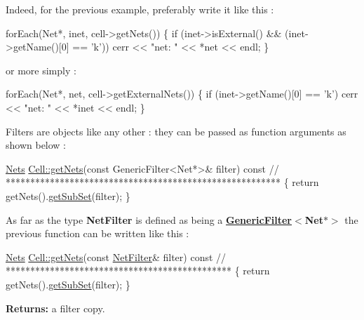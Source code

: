 Indeed, for the previous example, preferably write it like this \+: 
\begin{DoxyCode}
forEach(Net*, inet, cell->getNets()) \{
   \textcolor{keywordflow}{if} (inet->isExternal() && (inet->getName()[0] == \textcolor{charliteral}{'k'}))
      cerr << \textcolor{stringliteral}{"net: "} << *net << endl;
\}
\end{DoxyCode}
 or more simply \+: 
\begin{DoxyCode}
forEach(Net*, net, cell->getExternalNets()) \{
   \textcolor{keywordflow}{if} (inet->getName()[0] == \textcolor{charliteral}{'k'})
      cerr << \textcolor{stringliteral}{"net: "} << *inet << endl;
\}
\end{DoxyCode}
 Filters are objects like any other \+: they can be passed as function arguments as shown below \+: 
\begin{DoxyCode}
\mbox{\hyperlink{namespaceHurricane_a3404a8b17130a1824f4a281704b04df7}{Nets}} \mbox{\hyperlink{classHurricane_1_1Cell_a8b4728abe83e9ec21d7bee1154218279}{Cell::getNets}}(\textcolor{keyword}{const} GenericFilter<Net*>& filter) \textcolor{keyword}{const}
\textcolor{comment}{// ********************************************************}
\{
   \textcolor{keywordflow}{return} getNets().\mbox{\hyperlink{classHurricane_1_1Collection_aa32ea7249d57ee05e3c71dcde8106832}{getSubSet}}(filter);
\}
\end{DoxyCode}
 As far as the type {\bfseries Net\+Filter} is defined as being a {\bfseries \mbox{\hyperlink{classHurricane_1_1GenericFilter}{Generic\+Filter}}$<$Net$\ast$$>$} the previous function can be written like this \+: 
\begin{DoxyCode}
\mbox{\hyperlink{namespaceHurricane_a3404a8b17130a1824f4a281704b04df7}{Nets}} \mbox{\hyperlink{classHurricane_1_1Cell_a8b4728abe83e9ec21d7bee1154218279}{Cell::getNets}}(\textcolor{keyword}{const} \mbox{\hyperlink{namespaceHurricane_a0dfd2c5b40325a919d139091312732e9}{NetFilter}}& filter) \textcolor{keyword}{const}
\textcolor{comment}{// **********************************************}
\{
   \textcolor{keywordflow}{return} getNets().\mbox{\hyperlink{classHurricane_1_1Collection_aa32ea7249d57ee05e3c71dcde8106832}{getSubSet}}(filter);
\}
\end{DoxyCode}


{\bfseries Returns\+:} a filter copy. \mbox{\label{classHurricane_1_1Filter_aeaa771f17950fe05273c471ccfffb7f7}} 
